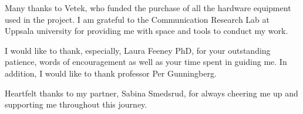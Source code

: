 Many thanks to Vetek, who funded the purchase of all the hardware equipment used in the project. I am grateful to the  Communication Research Lab at Uppsala university for providing me with space and tools to conduct my work.

I would like to thank, especially, Laura Feeney PhD, for your outstanding patience, words of encouragement as well as your time spent in guiding me. In addition, I would like to thank professor Per Gunningberg.

Heartfelt thanks to my partner, Sabina Smedsrud, for always cheering me up and supporting me throughout this journey.